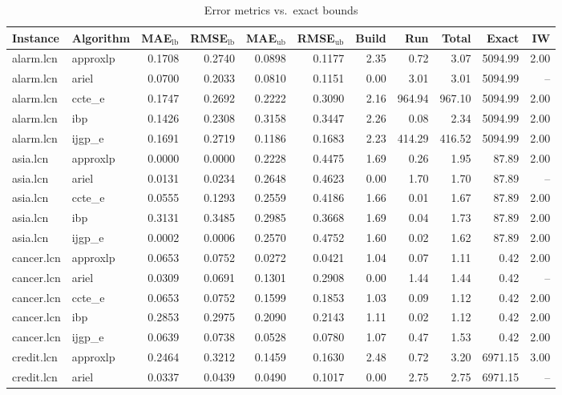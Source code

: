 \begin{table}[ht]
\centering
\scriptsize
\caption{Error metrics vs.\ exact bounds}
\begin{tabular}{llrrrrrrrrr}
\toprule
Instance & Algorithm & MAE$_{\text{lb}}$ & RMSE$_{\text{lb}}$ & MAE$_{\text{ub}}$ & RMSE$_{\text{ub}}$ & Build & Run & Total & Exact & IW \\
\midrule
alarm.lcn & approxlp & 0.1708 & 0.2740 & 0.0898 & 0.1177 & 2.35 & 0.72 & 3.07 & 5094.99 & 2.00 \\
alarm.lcn & ariel & 0.0700 & 0.2033 & 0.0810 & 0.1151 & 0.00 & 3.01 & 3.01 & 5094.99 & -- \\
alarm.lcn & ccte_e & 0.1747 & 0.2692 & 0.2222 & 0.3090 & 2.16 & 964.94 & 967.10 & 5094.99 & 2.00 \\
alarm.lcn & ibp & 0.1426 & 0.2308 & 0.3158 & 0.3447 & 2.26 & 0.08 & 2.34 & 5094.99 & 2.00 \\
alarm.lcn & ijgp_e & 0.1691 & 0.2719 & 0.1186 & 0.1683 & 2.23 & 414.29 & 416.52 & 5094.99 & 2.00 \\
asia.lcn & approxlp & 0.0000 & 0.0000 & 0.2228 & 0.4475 & 1.69 & 0.26 & 1.95 & 87.89 & 2.00 \\
asia.lcn & ariel & 0.0131 & 0.0234 & 0.2648 & 0.4623 & 0.00 & 1.70 & 1.70 & 87.89 & -- \\
asia.lcn & ccte_e & 0.0555 & 0.1293 & 0.2559 & 0.4186 & 1.66 & 0.01 & 1.67 & 87.89 & 2.00 \\
asia.lcn & ibp & 0.3131 & 0.3485 & 0.2985 & 0.3668 & 1.69 & 0.04 & 1.73 & 87.89 & 2.00 \\
asia.lcn & ijgp_e & 0.0002 & 0.0006 & 0.2570 & 0.4752 & 1.60 & 0.02 & 1.62 & 87.89 & 2.00 \\
cancer.lcn & approxlp & 0.0653 & 0.0752 & 0.0272 & 0.0421 & 1.04 & 0.07 & 1.11 & 0.42 & 2.00 \\
cancer.lcn & ariel & 0.0309 & 0.0691 & 0.1301 & 0.2908 & 0.00 & 1.44 & 1.44 & 0.42 & -- \\
cancer.lcn & ccte_e & 0.0653 & 0.0752 & 0.1599 & 0.1853 & 1.03 & 0.09 & 1.12 & 0.42 & 2.00 \\
cancer.lcn & ibp & 0.2853 & 0.2975 & 0.2090 & 0.2143 & 1.11 & 0.02 & 1.12 & 0.42 & 2.00 \\
cancer.lcn & ijgp_e & 0.0639 & 0.0738 & 0.0528 & 0.0780 & 1.07 & 0.47 & 1.53 & 0.42 & 2.00 \\
credit.lcn & approxlp & 0.2464 & 0.3212 & 0.1459 & 0.1630 & 2.48 & 0.72 & 3.20 & 6971.15 & 3.00 \\
credit.lcn & ariel & 0.0337 & 0.0439 & 0.0490 & 0.1017 & 0.00 & 2.75 & 2.75 & 6971.15 & -- \\

\end{tabular}
\end{table}
